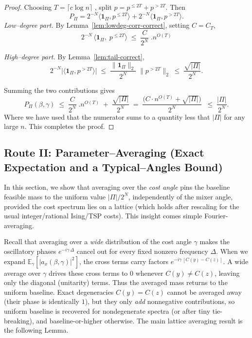 \documentclass[a4paper,onecolumn,11pt,unpublished]{quantumarticle}
\theoremstyle{remark}
\begin{document}
\begin{proof}
Choosing $T=\lceil c\log n\rceil$ , split $p=p^{\le 2T}+p^{>2T}$. Then
\[
  P_\Pi = 2^{-N}\langle \mathbf{1}_\Pi, p^{\le 2T}\rangle
         + 2^{-N}\langle \mathbf{1}_\Pi, p^{> 2T}\rangle.
\]
\emph{Low–degree part.}
By Lemma~\ref{lem:lowdeg-corr-correct}, setting $C=C_T$,
\[
  2^{-N}\,\bigl\langle \mathbf{1}_\Pi,\; p^{\le2T}\bigr\rangle
    \;\le\;
     \frac{{C}}{2^{N}}\; . n^{O(T)} 
\]


\emph{High–degree part.}
By Lemma~\ref{lem:tail-correct},
\[
  2^{-N}\bigl|\langle \mathbf{1}_\Pi, p^{>2T}\rangle\bigr|
  \;\le\; \frac{\|\mathbf{1}_\Pi\|_2}{2^{N}}\;\|p^{>2T}\|_2
  \;\le\; \frac{\sqrt{|\Pi|}}{2^{N}}.
\]



Summing the two contributions gives
\[
  P_\Pi(\beta,\gamma)
  \;\le\;  \frac{{C}}{2^{N}}\; . n^{O(T)} 
           \;+\;  \frac{\sqrt{|\Pi|}}{2^{N}}
            \;=\; \frac{({C \cdot n^{O(T)} + \sqrt{|\Pi|})}}{2^{N}}\;
  \;\le\; \frac{|\Pi|}{2^{N}}.
\]
Where we have used that the numerator sums to a quantity less that $|\Pi|$ for any large $n$. This completes the proof.
\end{proof}




\subsection{Route II: Parameter–Averaging (Exact Expectation and a Typical–Angles Bound)}
\label{app:avg-angles}

In this section, we show that averaging over the \emph{cost angle} pins the baseline feasible mass to the uniform value $|\Pi|/2^{N}$, independently of the mixer angle, provided the cost spectrum lies on a lattice (which holds after rescaling for the usual integer/rational Ising/TSP costs). This insight comes simple Fourier-averaging. 

\medskip
\noindent
Recall that averaging over a \emph{wide} distribution of the cost angle $\gamma$ makes the oscillatory
phases $e^{-i\gamma\,\Delta}$ cancel out for every fixed nonzero frequency $\Delta$.
When we expand $\mathbb{E}_\gamma\!\left[|a_x(\beta,\gamma)|^2\right]$, the cross terms
carry factors $e^{-i\gamma\,[C(y)-C(z)]}$. A wide average over $\gamma$ drives these
cross terms to $0$ whenever $C(y)\neq C(z)$, leaving only the diagonal (unitarity) terms.
Thus the averaged mass returns to the uniform baseline. Exact degeneracies
$C(y)=C(z)$ cannot be averaged away (their phase is identically $1$), but they only
\emph{add} nonnegative contributions, so uniform baseline is recovered for
nondegenerate spectra (or after tiny tie-breaking), and baseline-or-higher otherwise. The main lattice averaging result is the following Lemma.
\end{document}
